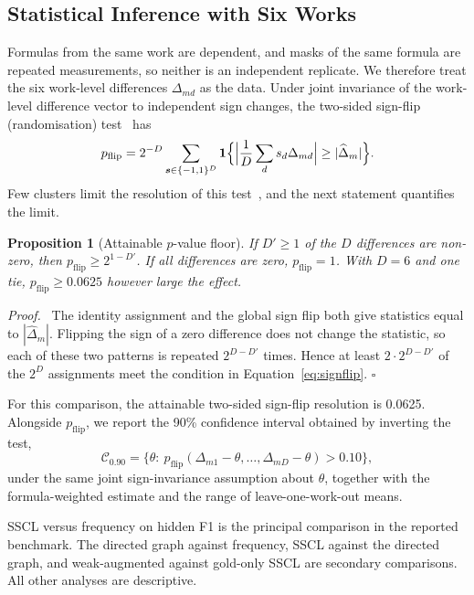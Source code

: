 \documentclass[applsci,article,submit,oneauthor]{Definitions/mdpi}
\newtheorem{xprop}{Proposition}
\newenvironment{xproof}{\par\noindent\textit{Proof.}\ }{\hfill$\square$\par\medskip}
\begin{document}
\subsection{Statistical Inference with Six Works}
\label{sec:inference}

Formulas from the same work are dependent, and masks of the same formula are repeated measurements, so neither is an independent replicate. We therefore treat the six work-level differences $\Delta_{md}$ as the data. Under joint invariance of the work-level difference vector to independent sign changes, the two-sided sign-flip (randomisation) test~\cite{fisher1935} has
\begin{equation}
p_{\mathrm{flip}}=2^{-D}\sum_{\bm s\in\{-1,1\}^D}\mathbf 1\Bigl\{\Bigl|\frac1D\sum_ds_d\Delta_{md}\Bigr|\ge|\widehat\Delta_m|\Bigr\}.
\label{eq:signflip}
\end{equation}
Few clusters limit the resolution of this test~\cite{cameron2008}, and the next statement quantifies the limit.

\begin{xprop}[Attainable $p$-value floor]
\label{prop:floor}
If $D'\ge1$ of the $D$ differences are non-zero, then $p_{\mathrm{flip}}\ge2^{1-D'}$. If all differences are zero, $p_{\mathrm{flip}}=1$. With $D=6$ and one tie, $p_{\mathrm{flip}}\ge0.0625$ however large the effect.
\end{xprop}
\begin{xproof}
The identity assignment and the global sign flip both give statistics equal to $|\widehat\Delta_m|$. Flipping the sign of a zero difference does not change the statistic, so each of these two patterns is repeated $2^{D-D'}$ times. Hence at least $2\cdot2^{D-D'}$ of the $2^D$ assignments meet the condition in Equation~\eqref{eq:signflip}.
\end{xproof}

For this comparison, the attainable two-sided sign-flip resolution is 0.0625. Alongside $p_{\mathrm{flip}}$, we report the 90\% confidence interval obtained by inverting the test,
\begin{equation}
\mathcal C_{0.90}=\bigl\{\theta:\ p_{\mathrm{flip}}(\Delta_{m1}-\theta,\dots,\Delta_{mD}-\theta)>0.10\bigr\},
\label{eq:ci}
\end{equation}
under the same joint sign-invariance assumption about $\theta$, together with the formula-weighted estimate and the range of leave-one-work-out means.

SSCL versus frequency on hidden F1 is the principal comparison in the reported benchmark. The directed graph against frequency, SSCL against the directed graph, and weak-augmented against gold-only SSCL are secondary comparisons. All other analyses are descriptive.
\end{document}
